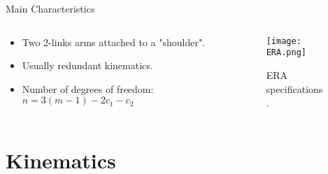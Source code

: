 \begin{frame}{Main Characteristics}
\begin{columns}
    \begin{column}{0.5\textwidth}
    \begin{itemize}
        \item Two 2-links arms attached to a "shoulder".
        \item Usually redundant kinematics.
        \item Number of degrees of freedom: $n=3(m-1)-2c_1-c_2$
    \end{itemize}
    
    \end{column}
    \begin{column}{0.5\textwidth}
        \begin{figure}
            \centering
            \texttt{[image: ERA.png]}
            \caption{ERA specifications~\cite{era}.}
        \end{figure}
    \end{column}
\end{columns}
\end{frame}

\section{Kinematics}

